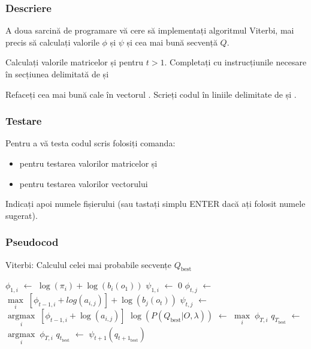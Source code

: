 \documentclass[12pt]{article}
\begin{document}
\subsubsection{Descriere}
\label{sec:desc-viterbi}

A doua sarcină de programare vă cere să implementați algoritmul
Viterbi, mai precis să calculați valorile $\phi$ și $\psi$ și cea mai
bună secvență $Q$.

Calculați valorile matricelor  și  pentru
$t>1$. Completați cu instrucțiunile necesare în secțiunea delimitată
de  și 


Refaceți cea mai bună cale în vectorul . Scrieți codul în
liniile delimitate de  și
.




\subsubsection{Testare}
\label{sec:test-viterbi}

Pentru a vă testa codul scris folosiți comanda:
\begin{itemize}
\item {} pentru testarea valorilor
  matricelor  și 
\item {} pentru testarea valorilor
  vectorului 
\end{itemize}
Indicați apoi numele fișierului (sau tastați simplu ENTER dacă ați
folosit numele sugerat).


\subsubsection{Pseudocod}
\label{sec:pseudocod-viterbi}

\begin{algorithm}[H]
  \caption{Viterbi: Calculul celei mai probabile secvențe $Q_{\text{best}}$}
  \label{alg:viterbi}
  \begin{algorithmic}[2]
    \STATE $\phi_{1,i}$ $\leftarrow$ $\log(\pi_{i}) + \log(b_i(o_1))$
    \STATE $\psi_{1,i}$ $\leftarrow$ $0$
    \ENDFOR
    \STATE $\phi_{t,j}$ $\leftarrow$ $\underset{i}{\operatorname{max}}\; [\phi_{t-1,i} +
    log(a_{i,j})] + \log(b_{j}(o_{t}))$
    \STATE $\psi_{t,j}$ $\leftarrow$ $\underset{i}{\operatorname{argmax}}\; [\phi_{t-1,i} +
    \log(a_{i,j})]$
    \ENDFOR
    \ENDFOR
    \STATE $\log(P(Q_{\text{best}} \vert O, \lambda))$ $\leftarrow$ $\underset{i}{\operatorname{max}}\; \phi_{T,i}$
    \STATE $q_{T_{\text{best}}}$ $\leftarrow$ $\underset{i}{\operatorname{argmax}}\; \phi_{T,i}$
    \STATE $q_{t_{\text{best}}}$ $\leftarrow$ $\psi_{t+1}(q_{t+1_{\text{best}}})$
    \ENDFOR
  \end{algorithmic} 
\end{algorithm}
 
\end{document}
